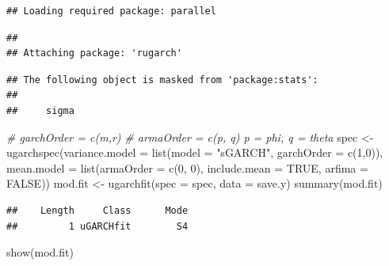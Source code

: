 \documentclass[
]{book}
\newenvironment{Shaded}{\begin{snugshade}}{\end{snugshade}}
\newcommand{\AttributeTok}[1]{\textcolor[rgb]{0.77,0.63,0.00}{#1}}
\newcommand{\CommentTok}[1]{\textcolor[rgb]{0.56,0.35,0.01}{\textit{#1}}}
\newcommand{\ConstantTok}[1]{\textcolor[rgb]{0.00,0.00,0.00}{#1}}
\newcommand{\DecValTok}[1]{\textcolor[rgb]{0.00,0.00,0.81}{#1}}
\newcommand{\FunctionTok}[1]{\textcolor[rgb]{0.00,0.00,0.00}{#1}}
\newcommand{\NormalTok}[1]{#1}
\newcommand{\OtherTok}[1]{\textcolor[rgb]{0.56,0.35,0.01}{#1}}
\newcommand{\StringTok}[1]{\textcolor[rgb]{0.31,0.60,0.02}{#1}}
\theoremstyle{definition}
\theoremstyle{definition}
\theoremstyle{definition}
\theoremstyle{definition}
\theoremstyle{remark}
\begin{document}
\begin{verbatim}
## Loading required package: parallel
\end{verbatim}

\begin{verbatim}
## 
## Attaching package: 'rugarch'
\end{verbatim}

\begin{verbatim}
## The following object is masked from 'package:stats':
## 
##     sigma
\end{verbatim}

\begin{Shaded}
\begin{Highlighting}[]
\CommentTok{\# garchOrder = c(m,r)}
\CommentTok{\# armaOrder = c(p, q) p = phi, q = theta}
\NormalTok{spec }\OtherTok{\textless{}{-}} \FunctionTok{ugarchspec}\NormalTok{(}\AttributeTok{variance.model =} \FunctionTok{list}\NormalTok{(}\AttributeTok{model =} 
   \StringTok{"sGARCH"}\NormalTok{, }\AttributeTok{garchOrder =} \FunctionTok{c}\NormalTok{(}\DecValTok{1}\NormalTok{,}\DecValTok{0}\NormalTok{)), }\AttributeTok{mean.model =} 
    \FunctionTok{list}\NormalTok{(}\AttributeTok{armaOrder =} \FunctionTok{c}\NormalTok{(}\DecValTok{0}\NormalTok{, }\DecValTok{0}\NormalTok{), }\AttributeTok{include.mean =} \ConstantTok{TRUE}\NormalTok{, }\AttributeTok{arfima =} 
    \ConstantTok{FALSE}\NormalTok{))}
\NormalTok{mod.fit }\OtherTok{\textless{}{-}} \FunctionTok{ugarchfit}\NormalTok{(}\AttributeTok{spec =}\NormalTok{ spec, }\AttributeTok{data =}\NormalTok{ save.y)}
\FunctionTok{summary}\NormalTok{(mod.fit)}
\end{Highlighting}
\end{Shaded}

\begin{verbatim}
##    Length     Class      Mode 
##         1 uGARCHfit        S4
\end{verbatim}

\begin{Shaded}
\begin{Highlighting}[]
\FunctionTok{show}\NormalTok{(mod.fit)}
\end{Highlighting}
\end{Shaded}
\end{document}
